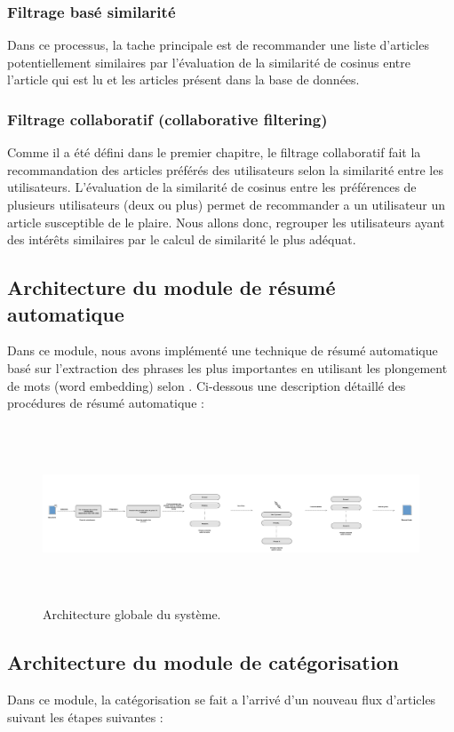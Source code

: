 \subsubsection{Filtrage basé similarité}
Dans ce processus, la tache principale est de recommander une liste d'articles potentiellement similaires par l'évaluation de la similarité de cosinus entre l'article qui est lu et les articles présent dans la base de données.
 
\subsubsection{Filtrage collaboratif (collaborative filtering)}
Comme il a été défini dans le premier chapitre, le filtrage collaboratif fait la recommandation des articles préférés des utilisateurs selon la similarité entre les utilisateurs. L'évaluation de la similarité de cosinus entre les préférences de plusieurs utilisateurs (deux ou plus) permet de recommander a un utilisateur un article susceptible de le plaire. 
Nous allons donc, regrouper les utilisateurs ayant des intérêts similaires par le calcul de similarité le plus adéquat.

\subsection{Architecture du module de résumé automatique}
Dans ce module, nous avons implémenté une technique de résumé automatique basé sur l'extraction des phrases les plus importantes en utilisant les plongement de mots (word embedding) selon \cite{extractiveword2vec}. Ci-dessous une description détaillé des procédures de résumé automatique :

\begin{figure}[H]
	\centering
	\includegraphics[height=150pt,width=500pt]{img/chapter3/ressche.jpg}
	\caption{Architecture globale du système.}
\end{figure}


\subsection{Architecture du module de catégorisation}
Dans ce module, la catégorisation se fait a l'arrivé d'un nouveau flux d'articles suivant les étapes suivantes :

